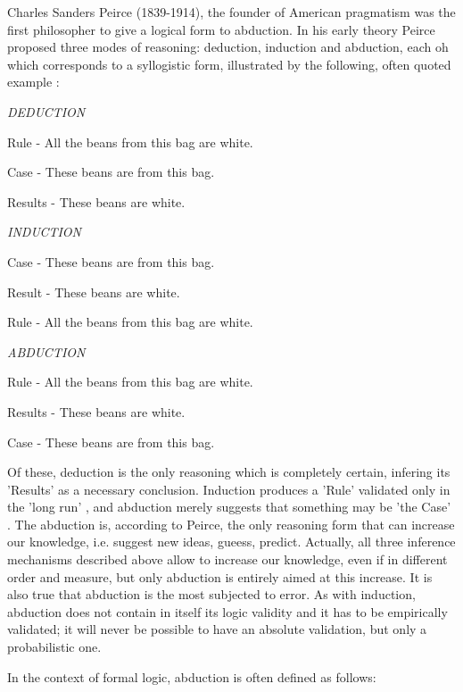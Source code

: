Charles Sanders Peirce (1839-1914), the founder of American pragmatism was the first philosopher to give a logical form to abduction. In his early theory Peirce proposed three modes of reasoning: deduction, induction and abduction, each oh which corresponds to a syllogistic form, illustrated by the following, often quoted example \cite{Peirce1932}:
\vspace{1\baselineskip}

\textit{DEDUCTION}

Rule - All the beans from this bag are white.

Case - These beans are from this bag.

Results - These beans are white.
\vspace{1\baselineskip}

\textit{INDUCTION}

Case - These beans are from this bag.

Result - These beans are white.

Rule - All the beans from this bag are white.
\vspace{1\baselineskip}

\textit{ABDUCTION}

Rule - All the beans from this bag are white.

Results - These beans are white.

Case - These beans are from this bag.
\vspace{1\baselineskip}

Of these, deduction is the only reasoning which is completely certain, infering its 'Results' as a necessary conclusion. Induction produces a 'Rule' validated only in the 'long run' \cite{Peirce1932}, and abduction merely suggests that something may be 'the Case' \cite{Peirce1932}. The abduction is, according to Peirce, the only reasoning form that can increase our knowledge, i.e. suggest new ideas, gueess, predict. Actually, all three inference mechanisms described above allow to increase our knowledge, even if in different order and measure, but only abduction is entirely aimed at this increase. It is also true that abduction is the most subjected to error. As with induction, abduction does not contain in itself its logic validity and it has to be empirically validated; it will never be possible to have an absolute validation, but only a probabilistic one.

In the context of formal logic, abduction is often defined as follows:


